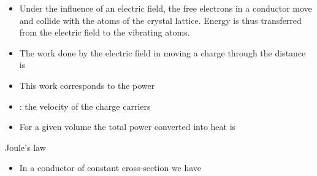 \begin{ELunit}


\begin{itemize}
\tightlist
\item
  Under the influence of an electric field, the free electrons in a conductor move and collide with the atoms of the crystal lattice. Energy is thus transferred from the electric field to the vibrating atoms.
\item
  The work done by the electric field in moving a charge  through the distance \ELim{\Delta\ell} is
\end{itemize}


\begin{itemize}
\tightlist
\item
  This work corresponds to the power
\end{itemize}


\begin{itemize}
\tightlist
\item
  : the velocity of the charge carriers
\end{itemize}


\end{ELunit}

\begin{ELjoin}

\begin{itemize}
\tightlist
\item
  For a given volume  the total power converted into heat is
\end{itemize}

\begin{ELimportant}{Joule's law}


\end{ELimportant}

\end{ELjoin}

\begin{ELjoin}

\begin{itemize}
\tightlist
\item
  In a conductor of constant cross-section we have
\end{itemize}


\begin{ELimportant}{}


\end{ELimportant}

\end{ELjoin}

